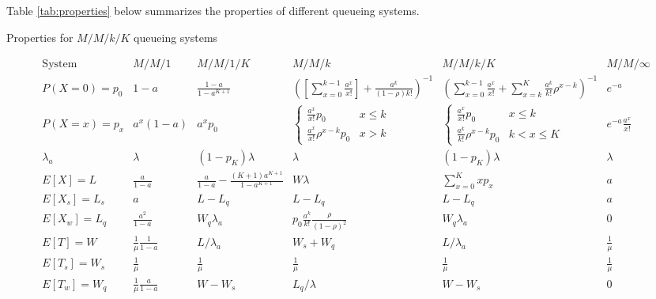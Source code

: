 \documentclass{article}
\renewcommand{\alpha}{a} %
\begin{document}
Table \ref{tab:properties} below summarizes the properties of different queueing systems.

\begin{table}[h]
\caption{Properties for $M/M/k/K$ queueing systems}
\label{tab:properties}
\[ \begin{array}{c|ccccc}
\mbox{System} & M/M/1 & M/M/1/K & M/M/k & M/M/k/K & M/M/\infty \\
\hline
P(X=0)=p_0 & 1-\alpha & \frac{1-\alpha}{1-\alpha^{K+1}} & \left(\left[\sum_{x=0}^{k-1} \frac{\alpha^x}{x!}\right] + \frac{\alpha^k}{(1-\rho)k!}\right)^{-1} &
\left(\sum_{x=0}^{k-1} \frac{\alpha^x}{x!} + \sum_{x=k}^K \frac{\alpha^k}{k!}\rho^{x-k} \right)^{-1} 
& e^{-\alpha} \\
P(X=x)=p_x & \alpha^x (1-\alpha) & a^x p_0 & \left\{ \begin{array}{ll} \frac{\alpha^x}{x!}p_0 & x\le k \\ \frac{\alpha^x}{x!} \rho^{x-k}p_0 & x>k \end{array} \right. 
& \left\{ \begin{array}{ll} \frac{\alpha^x}{x!}p_0 & x\le k \\ \frac{\alpha^k}{k!} \rho ^{x-k}p_0 & k<x\le K \end{array} \right.   & e^{-\alpha} \frac{\alpha^x}{x!} \\
\hline
\lambda_a & \lambda & (1-p_K)\lambda & \lambda & (1-p_K)\lambda & \lambda \\
\hline
E[X]=L & \frac{\alpha}{1-\alpha} & \frac{\alpha}{1-\alpha} - \frac{(K+1)\alpha^{K+1}}{1-\alpha^{K+1}} & W\lambda & \sum_{x=0}^K x p_x & \alpha \\
E[X_s]=L_s & \alpha & L-L_q & L-L_q & L-L_q & a \\
E[X_w]=L_q & \frac{\alpha^2}{1-\alpha} & W_q \lambda_a & p_0 \frac{a^k}{k!} \frac{\rho}{(1-\rho)^2} & W_q \lambda_a& 0 \\
E[T]=W & \frac{1}{\mu}\frac{1}{1-\alpha} & L/\lambda_a & W_s+W_q & L/\lambda_a& \frac{1}{\mu} \\
E[T_s]=W_s & \frac{1}{\mu} & \frac{1}{\mu} & \frac{1}{\mu} & \frac{1}{\mu} & \frac{1}{\mu} \\
E[T_w]=W_q & \frac{1}{\mu}\frac{\alpha}{1-\alpha} & W-W_s & L_q / \lambda  & W-W_s& 0 \\
\end{array} \]
\end{table}
\end{document}
